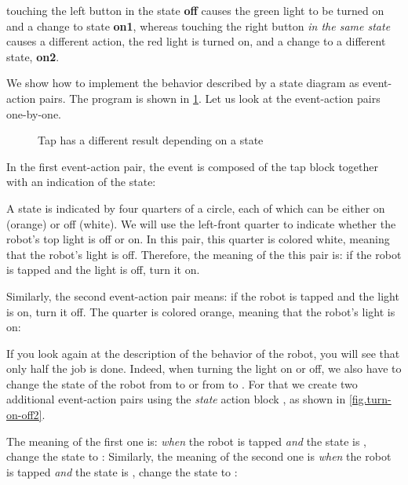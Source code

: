 touching the left button in the state \textbf{off} causes the green
light to be turned on and a change to state \textbf{on1}, whereas
touching the right button \emph{in the same state} causes a different
action, the red light is turned on, and a change to a different state, \textbf{on2}.


We show how to implement the behavior described by a state diagram as
event-action pairs. The program is shown in \cref{fig.turn-on-off}. Let us look
at the event-action pairs one-by-one.

\begin{figure}
	\hfill
	\caption{Tap has a different result depending on a state}
	\label{fig.turn-on-off}
\end{figure}

In the first event-action pair, the event is composed of the
tap block together with an indication of the state: 

A state is indicated by four quarters of a circle, each of which can be
either on (orange) or off (white). We will use the left-front quarter to
indicate whether the robot's top light is off or on. In this pair, this
quarter is colored white, meaning that the robot's light is off.
Therefore, the meaning of the this pair is: if the robot is tapped and the light is off, turn
it on.

Similarly, the second event-action pair means: if the robot
is tapped and the light is on, turn it off. The quarter is colored
orange, meaning that the robot's light is on: 

If you look again at the description of the behavior of the robot, you
will see that only half the job is done. Indeed, when turning the light on or
off, we also have to change the state of the robot from  to
 or from  to . For that we create two
additional event-action pairs using the \emph{state} action block
, as shown in \cref{fig.turn-on-off2}.

The meaning of the first one is: \emph{when} the robot is tapped
\emph{and} the state is , change the state to :
Similarly, the meaning of the second one is \emph{when} the robot
is tapped \emph{and} the state is , change the state to : 

